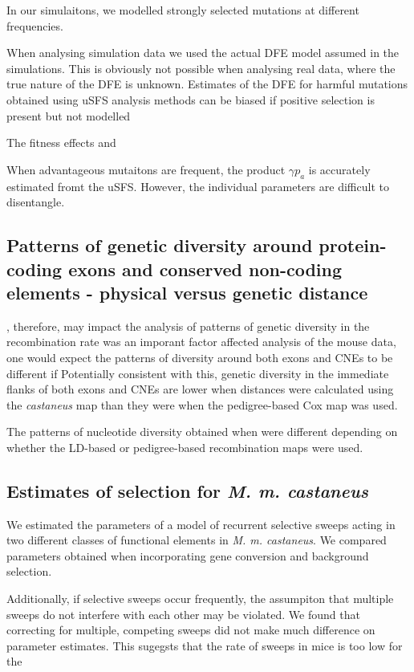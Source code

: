\documentclass[11pt]{article}
\begin{document}
	In our simulaitons, we modelled strongly selected mutations at different frequencies. 
	
	When analysing simulation data we used the actual DFE model assumed in the simulations. This is obviously not possible when analysing real data, where the true nature of the DFE is unknown. Estimates of the DFE for harmful mutations obtained using uSFS analysis methods can be biased if positive selection is present but not modelled 
	
The fitness effects and 

When advantageous mutaitons are frequent, the product $\gamma p_a$ is accurately estimated fromt the uSFS. However, the individual parameters are difficult to disentangle. 
	

\subsection*{Patterns of genetic diversity around protein-coding exons and conserved non-coding elements - physical versus genetic distance}

	
		, therefore, may impact the analysis of patterns of genetic diversity in the recombination rate was an imporant factor  affected analysis of the mouse data, one would expect the patterns of diversity around both exons and CNEs to be different if 
	Potentially consistent with this, genetic diversity in the immediate flanks of both exons and CNEs are lower when distances were calculated using the \textit{castaneus} map than they were when the pedigree-based Cox map was used.
	
		The patterns of nucleotide diversity obtained when were different depending on whether the LD-based or pedigree-based recombination maps were used. 
	
\subsection*{Estimates of selection for \textit{M. m. castaneus}}

	We estimated the parameters of a model of recurrent selective sweeps acting in two different classes of functional elements in \textit{M. m. castaneus}. We compared parameters obtained when incorporating gene conversion and background selection.
	
	Additionally, if selective sweeps occur frequently, the assumpiton that multiple sweeps do not interfere with each other may be violated. We found that correcting for multiple, competing sweeps did not make much difference on parameter estimates. This sugegsts that the rate of sweeps in mice is too low for the 
\end{document}
